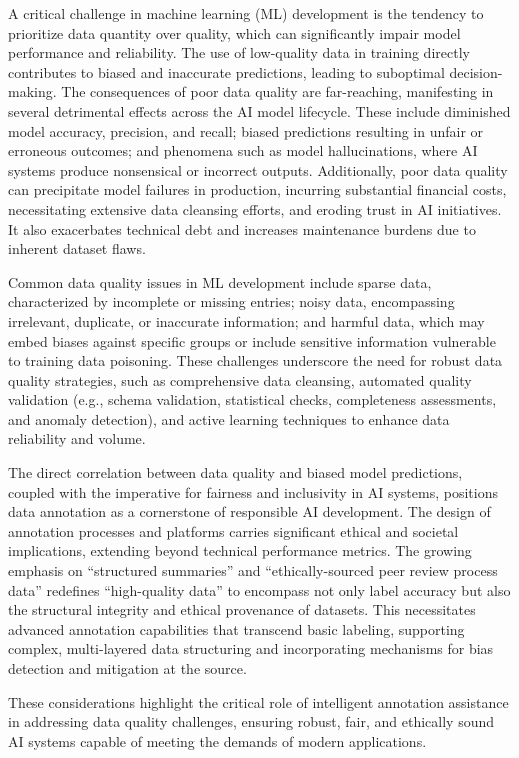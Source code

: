A critical challenge in machine learning (ML) development is the tendency to prioritize data quantity over quality, which can significantly impair model performance and reliability. The use of low-quality data in training directly contributes to biased and inaccurate predictions, leading to suboptimal decision-making. The consequences of poor data quality are far-reaching, manifesting in several detrimental effects across the AI model lifecycle. These include diminished model accuracy, precision, and recall; biased predictions resulting in unfair or erroneous outcomes; and phenomena such as model hallucinations, where AI systems produce nonsensical or incorrect outputs. Additionally, poor data quality can precipitate model failures in production, incurring substantial financial costs, necessitating extensive data cleansing efforts, and eroding trust in AI initiatives. It also exacerbates technical debt and increases maintenance burdens due to inherent dataset flaws.

Common data quality issues in ML development include sparse data, characterized by incomplete or missing entries; noisy data, encompassing irrelevant, duplicate, or inaccurate information; and harmful data, which may embed biases against specific groups or include sensitive information vulnerable to training data poisoning. These challenges underscore the need for robust data quality strategies, such as comprehensive data cleansing, automated quality validation (e.g., schema validation, statistical checks, completeness assessments, and anomaly detection), and active learning techniques to enhance data reliability and volume.

The direct correlation between data quality and biased model predictions, coupled with the imperative for fairness and inclusivity in AI systems, positions data annotation as a cornerstone of responsible AI development. The design of annotation processes and platforms carries significant ethical and societal implications, extending beyond technical performance metrics. The growing emphasis on ``structured summaries'' and ``ethically-sourced peer review process data'' redefines ``high-quality data'' to encompass not only label accuracy but also the structural integrity and ethical provenance of datasets. This necessitates advanced annotation capabilities that transcend basic labeling, supporting complex, multi-layered data structuring and incorporating mechanisms for bias detection and mitigation at the source.

These considerations highlight the critical role of intelligent annotation assistance in addressing data quality challenges, ensuring robust, fair, and ethically sound AI systems capable of meeting the demands of modern applications.
